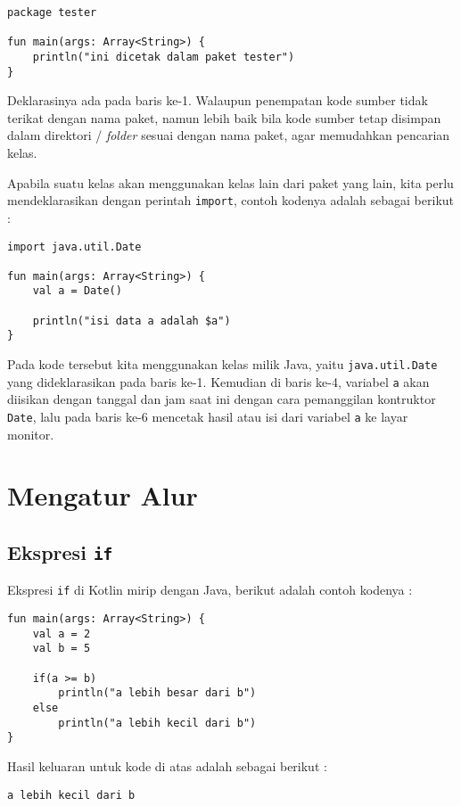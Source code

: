 \begin{lstlisting}
package tester

fun main(args: Array<String>) {
	println("ini dicetak dalam paket tester")
}
\end{lstlisting}

Deklarasinya ada pada baris ke-1. Walaupun penempatan kode sumber tidak terikat dengan nama paket, namun lebih baik bila kode sumber tetap disimpan dalam direktori / \textit{folder} sesuai dengan nama paket, agar memudahkan pencarian kelas.

Apabila suatu kelas akan menggunakan kelas lain dari paket yang lain, kita perlu mendeklarasikan dengan perintah \texttt{import}, contoh kodenya adalah sebagai berikut :

\begin{lstlisting}
import java.util.Date

fun main(args: Array<String>) {
	val a = Date()
	
	println("isi data a adalah $a")
}
\end{lstlisting}

Pada kode tersebut kita menggunakan kelas milik Java, yaitu \texttt{java.util.Date} yang dideklarasikan pada baris ke-1. Kemudian di baris ke-4, variabel \texttt{a} akan diisikan dengan tanggal dan jam saat ini dengan cara pemanggilan kontruktor \texttt{Date}, lalu pada baris ke-6 mencetak hasil atau isi dari variabel \texttt{a} ke layar monitor. 

\section{Mengatur Alur}

\subsection{Ekspresi \texttt{if}}

Ekspresi \texttt{if} di Kotlin mirip dengan Java, berikut adalah contoh kodenya :

\begin{lstlisting}
fun main(args: Array<String>) {
	val a = 2
	val b = 5
	
	if(a >= b)
		println("a lebih besar dari b")
	else
		println("a lebih kecil dari b")
}
\end{lstlisting}

Hasil keluaran untuk kode di atas adalah sebagai berikut :

\begin{lstlisting}
a lebih kecil dari b
\end{lstlisting}

